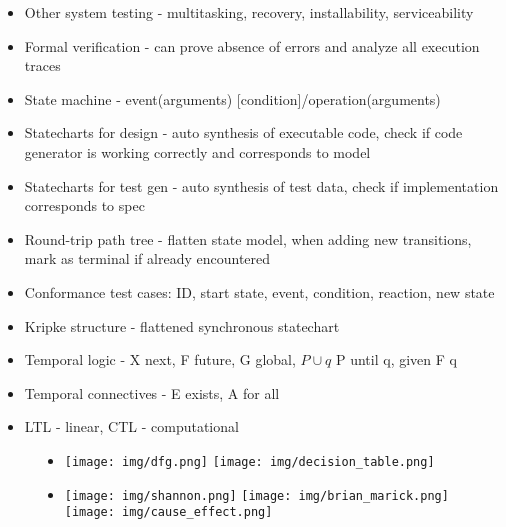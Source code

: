 \documentclass[10pt]{article}
\begin{document}
\begin{multicols}{2}
\begin{itemize}
        \item Other system testing - multitasking, recovery, installability, serviceability
        \item Formal verification - can prove absence of errors and analyze all execution traces
        \item State machine - event(arguments) [condition]/operation(arguments)
        \item Statecharts for design - auto synthesis of executable code, check if code generator is working correctly and corresponds to model 
        \item Statecharts for test gen - auto synthesis of test data, check if implementation corresponds to spec
        \item Round-trip path tree - flatten state model, when adding new transitions, mark as terminal if already encountered
        \item Conformance test cases: ID, start state, event, condition, reaction, new state
        \item Kripke structure - flattened  synchronous statechart 
        \item Temporal logic - X next, F future, G global, $P \cup q$ P until q, given F q
        \item Temporal connectives - E exists, A for all
        \item LTL - linear, CTL - computational
    \end{itemize}
    
\end{multicols}

\pagebreak


\begin{figure}[ht!]
    \begin{itemize}[label={}]
        \item \mbox{}
        
        \texttt{[image: img/dfg.png]}
        \texttt{[image: img/decision\_table.png]}

        \item \mbox{}

        \texttt{[image: img/shannon.png]}
        \texttt{[image: img/brian\_marick.png]}
        \texttt{[image: img/cause\_effect.png]}

    \end{itemize}
    
\end{figure}
\end{document}
